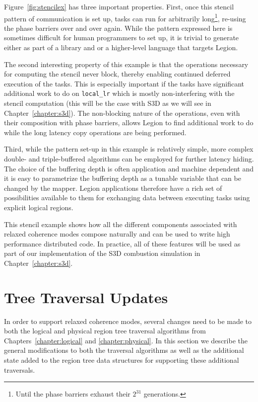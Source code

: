 Figure~\ref{fig:stencilex} has three important properties.
First, once this stencil pattern of communication is
set up, tasks can run for arbitrarily long\footnote{Until
the phase barriers exhaust their $2^{31}$ generations.},
re-using the phase barriers over and over again. While
the pattern expressed here is sometimes difficult for 
human programmers to set up, it is trivial to generate
either as part of a library and or a higher-level 
language that targets Legion. 

The second interesting
property of this example is that the operations 
necessary for computing the stencil never block, 
thereby enabling continued deferred execution of
the tasks. This is especially important if the tasks
have significant additional work to do on {\tt local\_lr}
which is mostly non-interfering with the stencil 
computation (this will be the case with S3D as we
will see in Chapter~\ref{chapter:s3d}). The non-blocking
nature of the operations, even with their composition
with phase barriers, allows Legion to find additional
work to do while the long latency copy operations are
being performed.

Third, while the pattern set-up in this example is
relatively simple, more complex double- and triple-buffered
algorithms can be employed for further latency hiding.
The choice of the buffering depth is often application
and machine dependent and it is easy to parametrize
the buffering depth as a tunable variable that can be
changed by the mapper. Legion applications therefore
have a rich set of possibilities available to them 
for exchanging data between executing tasks using 
explicit logical regions.

This stencil example shows how all the different
components associated with relaxed coherence modes
compose naturally and can be used to write high 
performance distributed code. In practice, all of
these features will be used as part of our implementation
of the S3D combustion simulation in Chapter~\ref{chapter:s3d}.


\section{Tree Traversal Updates}
\label{sec:relaxedupdates}
In order to support relaxed coherence modes,
several changes need to be made to both the
logical and physical region tree traversal
algorithms from Chapters~\ref{chapter:logical}
and \ref{chapter:physical}. In this section
we describe the general modifications to both
the traversal algorithms as well as the
additional state added to the region tree 
data structures for supporting these 
additional traversals.

